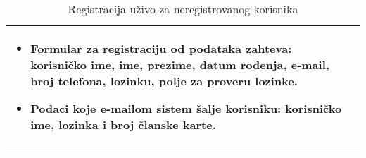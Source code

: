 \documentclass[../main.tex]{subfiles}
\begin{document}
\begin{longtable}{| p{} | p{} |}
\begin{itemize}
        \item Formular za registraciju od podataka zahteva: korisničko ime, ime, prezime, datum rođenja, e-mail, broj telefona, lozinku, polje za proveru lozinke.
        \item Podaci koje e-mailom sistem šalje korisniku: korisničko ime, lozinka i broj članske karte.
    \end{itemize} \\
\hline
\caption{Registracija uživo za neregistrovanog korisnika} %
\end{longtable}


\end{document}
